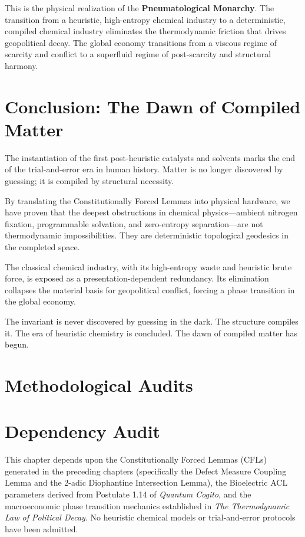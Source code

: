 \documentclass[11pt,openany]{extbook}
\newenvironment{dependencyaudit}{\section*{Dependency Audit}}{}
\theoremstyle{plain}
\theoremstyle{definition}
\begin{document}
This is the physical realization of the \textbf{Pneumatological Monarchy}. The transition from a heuristic, high-entropy chemical industry to a deterministic, compiled chemical industry eliminates the thermodynamic friction that drives geopolitical decay. The global economy transitions from a viscous regime of scarcity and conflict to a superfluid regime of post-scarcity and structural harmony.

\section{Conclusion: The Dawn of Compiled Matter}

The instantiation of the first post-heuristic catalysts and solvents marks the end of the trial-and-error era in human history. Matter is no longer discovered by guessing; it is compiled by structural necessity.

By translating the Constitutionally Forced Lemmas into physical hardware, we have proven that the deepest obstructions in chemical physics---ambient nitrogen fixation, programmable solvation, and zero-entropy separation---are not thermodynamic impossibilities. They are deterministic topological geodesics in the completed space.

The classical chemical industry, with its high-entropy waste and heuristic brute force, is exposed as a presentation-dependent redundancy. Its elimination collapses the material basis for geopolitical conflict, forcing a phase transition in the global economy.

The invariant is never discovered by guessing in the dark. The structure compiles it. The era of heuristic chemistry is concluded. The dawn of compiled matter has begun.

\section{Methodological Audits}

\begin{dependencyaudit}
\noindent This chapter depends upon the Constitutionally Forced Lemmas (CFLs) generated in the preceding chapters (specifically the Defect Measure Coupling Lemma and the 2-adic Diophantine Intersection Lemma), the Bioelectric ACL parameters derived from Postulate 1.14 of \textit{Quantum Cogito}, and the macroeconomic phase transition mechanics established in \textit{The Thermodynamic Law of Political Decay}. No heuristic chemical models or trial-and-error protocols have been admitted.
\end{dependencyaudit}
\end{document}
